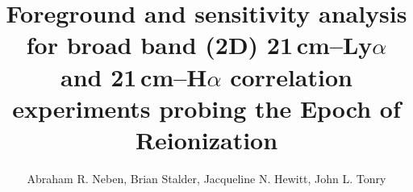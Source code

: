 \documentclass[numberedappendix]{emulateapj}
\begin{document}
\title{Foreground and sensitivity analysis for broad band (2D) 21\,\MakeLowercase{cm}--L\MakeLowercase{y}$\alpha$ and 21\,\MakeLowercase{cm}--H$\alpha$ correlation experiments probing the Epoch of Reionization}


\author{Abraham R. Neben,
Brian Stalder,
Jacqueline N. Hewitt,
John L. Tonry}



\end{document}
